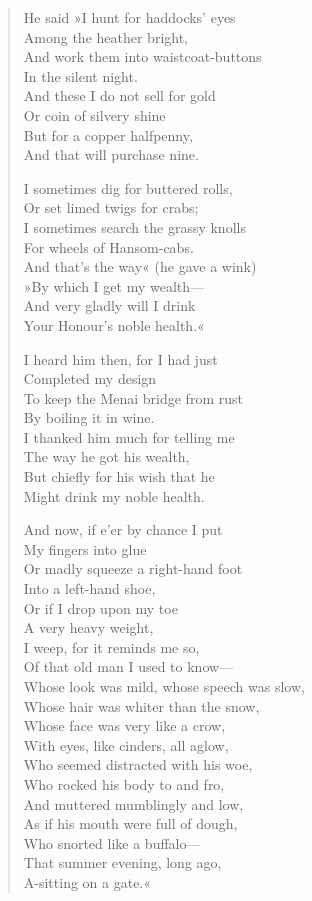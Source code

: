 \begin{verse}
He said »I hunt for haddocks' eyes\\
\vin Among the heather bright,\\
And work them into waistcoat-buttons\\
\vin In the silent night.\\
And these I do not sell for gold\\
\vin Or coin of silvery shine\\
But for a copper halfpenny,\\
\vin And that will purchase nine.

I sometimes dig for buttered rolls,\\
\vin Or set limed twigs for crabs;\\
I sometimes search the grassy knolls\\
\vin For wheels of Hansom-cabs.\\
And that's the way« (he gave a wink)\\
\vin »By which I get my wealth—\\
And very gladly will I drink\\
\vin Your Honour's noble health.«

I heard him then, for I had just\\
\vin Completed my design\\
To keep the Menai bridge from rust\\
\vin By boiling it in wine.\\
I thanked him much for telling me\\
\vin The way he got his wealth,\\
But chiefly for his wish that he\\
\vin Might drink my noble health.

And now, if e'er by chance I put\\
\vin My fingers into glue\\
Or madly squeeze a right-hand foot\\
\vin Into a left-hand shoe,\\
Or if I drop upon my toe\\
\vin A very heavy weight,\\
I weep, for it reminds me so,\\
\vin Of that old man I used to know—\\
Whose look was mild, whose speech was slow,\\
\vin Whose hair was whiter than the snow,\\
Whose face was very like a crow,\\
\vin With eyes, like cinders, all aglow,\\
Who seemed distracted with his woe,\\
\vin Who rocked his body to and fro,\\
And muttered mumblingly and low,\\
\vin As if his mouth were full of dough,\\
Who snorted like a buffalo—\\
\vin That summer evening, long ago,\\
A-sitting on a gate.«
\end{verse}

